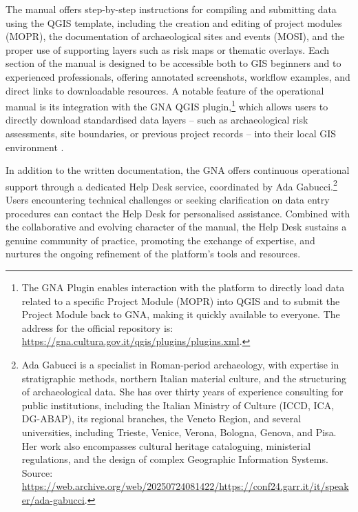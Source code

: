 \begin{spacing}{1.5}
The manual offers step-by-step instructions for compiling and submitting data using the QGIS template, including the creation and editing of project modules (MOPR), the documentation of archaeological sites and events (MOSI), and the proper use of supporting layers such as risk maps or thematic overlays. Each section of the manual is designed to be accessible both to GIS beginners and to experienced professionals, offering annotated screenshots, workflow examples, and direct links to downloadable resources. A notable feature of the operational manual is its integration with the GNA QGIS plugin,\footnote{The GNA Plugin enables interaction with the platform to directly load data related to a specific Project Module (MOPR) into QGIS and to submit the Project Module back to GNA, making it quickly available to everyone. The address for the official repository is: \url{https://gna.cultura.gov.it/qgis/plugins/plugins.xml}.} which allows users to directly download standardised data layers -- such as archaeological risk assessments, site boundaries, or previous project records -- into their local GIS environment \citep{gabucci_template_2023}.

In addition to the written documentation, the GNA offers continuous operational support through a dedicated Help Desk service, coordinated by Ada Gabucci.\footnote{Ada Gabucci is a specialist in Roman-period archaeology, with expertise in stratigraphic methods, northern Italian material culture, and the structuring of archaeological data. She has over thirty years of experience consulting for public institutions, including the Italian Ministry of Culture (ICCD, ICA, DG-ABAP), its regional branches, the Veneto Region, and several universities, including Trieste, Venice, Verona, Bologna, Genova, and Pisa. Her work also encompasses cultural heritage cataloguing, ministerial regulations, and the design of complex Geographic Information Systems.\\Source: \url{https://web.archive.org/web/20250724081422/https://conf24.garr.it/it/speaker/ada-gabucci}.\nocite{noauthor_ada_2025}} Users encountering technical challenges or seeking clarification on data entry procedures can contact the Help Desk for personalised assistance. Combined with the collaborative and evolving character of the manual, the Help Desk sustains a genuine community of practice, promoting the exchange of expertise, and nurtures the ongoing refinement of the platform’s tools and resources.


\end{spacing}

